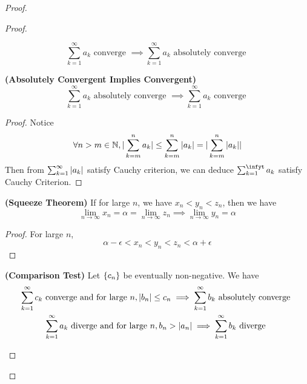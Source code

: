 \documentclass{report}
\begin{document}
\begin{proof}
\begin{proof}
\begin{theorem}
\begin{equation}
\sum_{k=1}^\infty a_k\text{ converge }\implies \sum_{k=1}^\infty a_k\text{ absolutely converge }
\end{equation}
\end{theorem}
\begin{theorem}
\label{4.2.5}
\textbf{(Absolutely Convergent Implies Convergent)} 
\begin{equation}
\sum_{k=1}^\infty a_k\text{ absolutely converge }\implies \sum_{k=1}^\infty a_k\text{ converge }
\end{equation}
\end{theorem}
\begin{proof}
Notice 
\begin{equation}
\forall n>m \in\mathbb{N}, |\sum_{k=m}^n a_k|\leq \sum_{k=m}^n |a_k|=|\sum_{k=m}^n |a_k||
\end{equation}
Then from $\sum_{k=1}^\infty |a_k|$ satisfy Cauchy criterion, we can deduce $\sum_{k=1}^\infyt a_k$ satisfy Cauchy Criterion. 
\end{proof}
\begin{theorem}
\label{4.2.6}
\textbf{(Squeeze Theorem)} If for large $n$, we have  $x_n<y_n<z_n$, then we have
 \begin{equation}
\lim_{n\to\infty}x_n=\alpha =\lim_{n\to\infty}z_n\implies \lim_{n\to\infty}y_n=\alpha 
\end{equation}
\end{theorem}
\begin{proof}
For large $n$, 
 \begin{equation}
\alpha -\epsilon <x_n<y_n<z_n<\alpha +\epsilon 
\end{equation}
\end{proof}
\begin{theorem}
\label{4.2.7}
\textbf{(Comparison Test)} Let $\{ c_n \}$ be eventually non-negative. We have
\begin{gather}
  \sum_{k=1}^\infty c_k\text{ converge and for large }n, |b_n|\leq c_n\implies \sum_{k=1}^\infty b_k\text{ absolutely converge }\\
  \sum_{k=1}^\infty a_k\text{ diverge and for large $n$}, b_n>|a_n|\implies \sum_{k=1}^\infty b_k\text{ diverge }
\end{gather}

\end{theorem}
\end{proof}
\end{proof}
\end{document}
